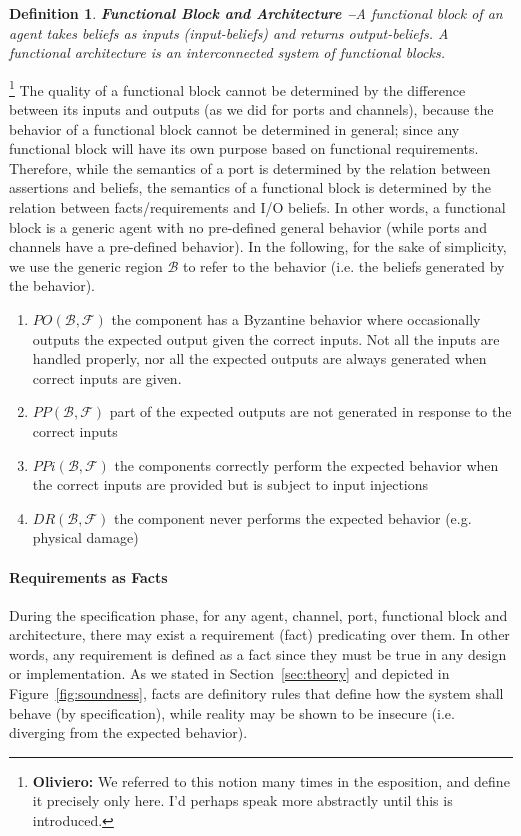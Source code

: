 \documentclass[conference]{IEEEtran}
\newcommand{\fixnote}[2]{\textbf{\color{red}{FIX}}\footnote{{\bf #1:} #2}}
\newcommand{\beliefRegion}{\mathcal{B}}
\newcommand{\factRegion}{\mathcal{F}}
\newcommand{\pp}[2]{PP(#1,#2)}
\newcommand{\po}[2]{PO(#1,#2)}
\newcommand{\ppi}[2]{PPi(#1,#2)}
\newcommand{\dr}[2]{DR(#1,#2)}
\newtheorem{definition}{Definition}%
\begin{document}
\begin{definition}{\bf Functional Block and Architecture --}\label{def:funblock}
	A functional block of an agent takes beliefs as  inputs (input-beliefs) and
	returns output-beliefs.  A functional architecture is an
	interconnected system of functional blocks.
\end{definition}\fixnote{Oliviero}{We referred to this notion many times in the esposition, and define it precisely only here. I'd perhaps speak more abstractly until this is introduced.}
The quality of a functional block cannot be determined
by the difference between its inputs and outputs (as we did for
ports and channels), because the behavior of a functional block
cannot be determined in general; since any functional block will have 
its own purpose based on functional requirements. 
Therefore, while the semantics of a port is determined by the relation 
between assertions and beliefs, the semantics of a functional block 
is determined by the relation between facts/requirements and I/O beliefs.
In other words, a functional block is a generic agent with no pre-defined general
behavior (while ports and channels have a pre-defined behavior).
In the following, for the sake of simplicity, 
we use the generic region $\beliefRegion$ to refer to the behavior (i.e.
the beliefs generated by the behavior).

\begin{enumerate}[start=50, label={W\arabic*)}]
	\item $\po{\beliefRegion}{\factRegion}$ the component has a Byzantine
		behavior where occasionally outputs the expected output given
		the correct inputs. Not all the inputs are handled properly,
		nor all the expected outputs are always generated when correct
		inputs are given.
	\item $\pp{\beliefRegion}{\factRegion}$ part of the expected outputs are not
	        generated in response to the correct
	        inputs
	\item $\ppi{\beliefRegion}{\factRegion}$ the components
	        correctly perform the expected behavior when the correct
	        inputs are provided but is subject to input
	        injections
	\item $\dr{\beliefRegion}{\factRegion}$ the component
		never performs the expected behavior (e.g. physical
		damage)
\end{enumerate}

\paragraph{Requirements as Facts}
During the specification phase, for any agent, channel, port, functional block
and architecture, there may exist a requirement (fact) predicating over them.
In other words, any requirement is defined as a fact since they must be true in
any design or implementation. As we stated in Section~\ref{sec:theory} and depicted in
Figure~\ref{fig:soundness}, facts are definitory rules that define how
the system shall behave (by specification), while reality may be shown to
be insecure (i.e. diverging from the expected behavior).
\end{document}
